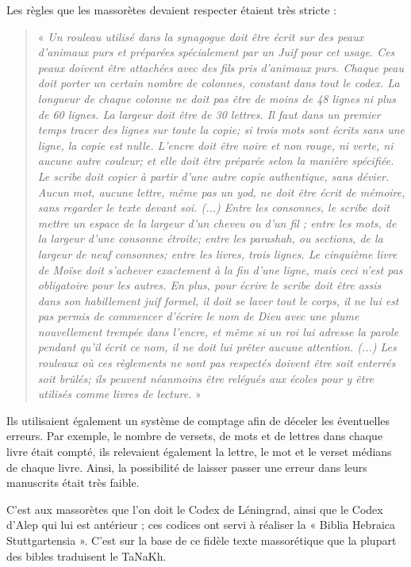 \begin{small}
Les règles que les massorètes devaient respecter étaient très stricte :

\begin{quote}
« \emph{Un rouleau utilisé dans la synagogue doit être écrit sur des peaux d’animaux purs et préparées spécialement par un Juif pour cet usage. Ces peaux doivent être attachées avec des fils pris d’animaux purs. Chaque peau doit porter un certain nombre de colonnes, constant dans tout le codex. La longueur de chaque colonne ne doit pas être de moins de 48 lignes ni plus de 60 lignes. La largeur doit être de 30 lettres. Il faut dans un premier temps tracer des lignes sur toute la copie; si trois mots sont écrits sans une ligne, la copie est nulle. L’encre doit être noire et non rouge, ni verte, ni aucune autre couleur; et elle doit être préparée selon la manière spécifiée. Le scribe doit copier à partir d’une autre copie authentique, sans dévier. Aucun mot, aucune lettre, même pas un yod, ne doit être écrit de mémoire, sans regarder le texte devant soi. (...) Entre les consonnes, le scribe doit mettre un espace de la largeur d’un cheveu ou d’un fil ; entre les mots, de la largeur d’une consonne étroite; entre les parashah, ou sections, de la largeur de neuf consonnes; entre les livres, trois lignes. Le cinquième livre de Moïse doit s’achever exactement à la fin d’une ligne, mais ceci n’est pas obligatoire pour les autres. En plus, pour écrire le scribe doit être assis dans son habillement juif formel, il doit se laver tout le corps, il ne lui est pas permis de commencer d’écrire le nom de Dieu avec une plume nouvellement trempée dans l’encre, et même si un roi lui adresse la parole pendant qu’il écrit ce nom, il ne doit lui prêter aucune attention. (...) Les rouleaux où ces règlements ne sont pas respectés doivent être soit enterrés soit brûlés; ils peuvent néanmoins être relégués aux écoles pour y être utilisés comme livres de lecture.} »
\end{quote}

Ils utilisaient également un système de comptage afin de déceler les éventuelles erreurs. Par exemple, le nombre de versets, de mots et de lettres dans chaque livre était compté, ils relevaient également la lettre, le mot et le verset médians de chaque livre. Ainsi, la possibilité de laisser passer une erreur dans leurs manuscrits était très faible.\bigskip

C'est aux massorètes que l'on doit le Codex de Léningrad, ainsi que le Codex d'Alep qui lui est antérieur ; ces codices ont servi à réaliser la « Biblia Hebraica Stuttgartensia ». C'est sur la base de ce fidèle texte massorétique que la plupart des bibles traduisent le TaNaKh.


\end{small}
